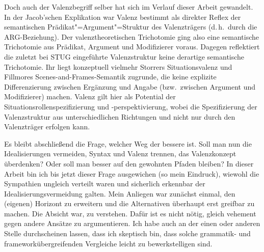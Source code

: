 Doch auch der Valenzbegriff selber hat sich im Verlauf dieser Arbeit gewandelt. In der Jacob'schen Explikation war Valenz bestimmt als direkter Reflex der semantischen Prädikat"=Argument"=Struktur des Valenzträgers (d.\,h.\ durch die ARG-Beziehung). Der valenztheoretischen Trichotomie ging also eine semantische Trichotomie aus Prädikat, Argument und Modifizierer voraus. Dagegen reflektiert die zuletzt bei STUG eingeführte Valenzstruktur keine derartige semantische Trichotomie. Ihr liegt konzeptuell vielmehr Storrers Situationsvalenz und Fillmores Scenes-and-Frames-Semantik zugrunde, die keine explizite Differenzierung zwischen Ergänzung und Angabe (bzw.\ zwischen Argument und Modifizierer) machen. Valenz gilt hier als Potential der Situationsrollenspezifizierung und \mbox{-perspektivierung}, wobei die Spezifizierung der Valenzstruktur aus unterschiedlichen Richtungen und nicht nur durch den Valenzträger erfolgen kann. 

Es bleibt abschließend die Frage, welcher Weg der bessere ist. Soll man nun die Idealisierungen vermeiden, Syntax und Valenz trennen, das Valenzkonzept überdenken? Oder soll man besser auf den gewohnten Pfaden bleiben? In dieser Arbeit bin ich bis jetzt dieser Frage ausgewichen (so mein Eindruck), wiewohl die Sympathien ungleich verteilt waren und sicherlich erkennbar der Idealisierungsvermeidung galten. Mein Anliegen war zunächst einmal, den (eigenen) Horizont zu erweitern und die Alternativen überhaupt erst greifbar zu machen. Die Absicht war, zu verstehen. Dafür ist es nicht nötig, gleich vehement gegen andere Ansätze zu argumentieren. Ich habe auch an der einen oder anderen Stelle durchscheinen lassen, dass ich skeptisch bin, dass solche grammatik- und frameworkübergreifenden Vergleiche leicht zu bewerkstelligen sind. 

